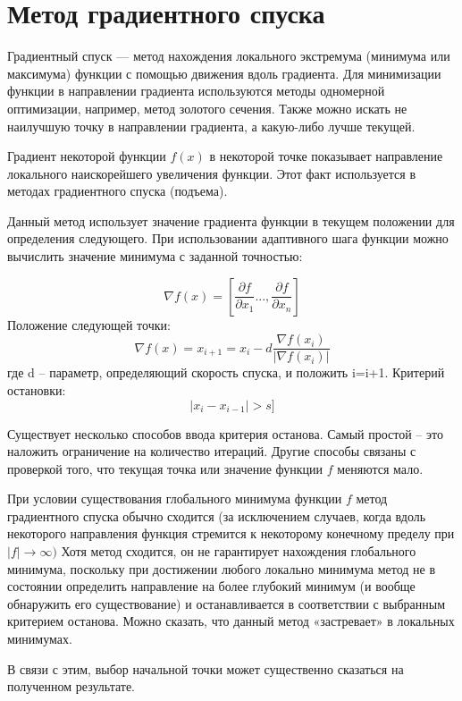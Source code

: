 \documentclass[14pt]{matmex-diploma-custom}
\begin{document}
\section{Метод градиентного спуска}
Градиентный спуск — метод нахождения локального экстремума (минимума или
максимума) функции с помощью движения вдоль градиента. Для минимизации функции в
направлении градиента используются методы одномерной оптимизации, например, метод
золотого сечения. Также можно искать не наилучшую точку в направлении градиента, а
какую-либо лучше текущей.
\par
Градиент некоторой функции $f(x)$ в некоторой точке показывает направление
локального наискорейшего увеличения функции. Этот факт используется в методах
градиентного спуска (подъема).
\par
Данный метод использует значение градиента функции в текущем положении для
определения следующего. При использовании адаптивного шага функции можно
вычислить значение минимума с заданной точностью:

\begin{equation}
    \label{частные_производные}
    \nabla f(x) = [ \frac{\partial f}{\partial x_1} ..., \frac{\partial f}{\partial x_n} ]
\end{equation}
Положение следующей точки:
\begin{equation}
    \label{следующая_точка}
    \nabla f(x) = x_{i+1} = x_i - d\frac{\nabla f(x_i)}{|\nabla f(x_i)|} 
\end{equation}
где d – параметр, определяющий скорость спуска, и положить i=i+1.
\newline
Критерий остановки:
\begin{equation}
    \label{критерий_остановки}
    |x_i - x_{i-1}| > s ]
\end{equation}

Существует несколько способов ввода критерия останова. Самый простой – это
наложить ограничение на количество итераций. Другие способы связаны с проверкой
того, что текущая точка или значение функции \(f\) меняются мало.
\par
При условии существования глобального минимума функции \(f\) метод
градиентного спуска обычно сходится (за исключением случаев, когда вдоль некоторого
направления функция стремится к некоторому конечному пределу при
\( |f| \to \infty) \)
Хотя метод сходится, он не гарантирует нахождения глобального минимума, поскольку при
достижении любого локально минимума метод не в состоянии определить направление на
более глубокий минимум (и вообще обнаружить его существование) и останавливается в
соответствии с выбранным критерием останова. Можно сказать, что данный метод
«застревает» в локальных минимумах.
\par
В связи с этим, выбор начальной точки может существенно сказаться на
полученном результате.
\end{document}
